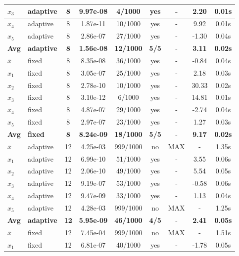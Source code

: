 \begin{longtable}{|l|l|c|c|c|c|c|c|c|}
\hline
$x_3$ & adaptive & 8 & 9.97e-08 & 4/1000 & yes & - & 2.20 & 0.01s \\
\hline
$x_4$ & adaptive & 8 & 1.87e-11 & 10/1000 & yes & - & 9.92 & 0.01s \\
\hline
$x_5$ & adaptive & 8 & 2.86e-07 & 27/1000 & yes & - & -1.30 & 0.04s \\
\hline
\hline\hline
\textbf{Avg} & \textbf{adaptive} & \textbf{8} & \textbf{1.56e-08} & \textbf{12/1000} & \textbf{5/5} & - & \textbf{3.11} & \textbf{0.02s} \\
\hline\hline
\hline
$\bar{x}$ & fixed & 8 & 8.35e-08 & 36/1000 & yes & - & -0.84 & 0.04s \\
\hline
$x_1$ & fixed & 8 & 3.05e-07 & 25/1000 & yes & - & 2.18 & 0.03s \\
\hline
$x_2$ & fixed & 8 & 2.78e-10 & 10/1000 & yes & - & 30.33 & 0.02s \\
\hline
$x_3$ & fixed & 8 & 3.10e-12 & 6/1000 & yes & - & 14.81 & 0.01s \\
\hline
$x_4$ & fixed & 8 & 4.87e-07 & 29/1000 & yes & - & -2.74 & 0.04s \\
\hline
$x_5$ & fixed & 8 & 2.97e-07 & 23/1000 & yes & - & 1.27 & 0.03s \\
\hline
\hline\hline
\textbf{Avg} & \textbf{fixed} & \textbf{8} & \textbf{8.24e-09} & \textbf{18/1000} & \textbf{5/5} & - & \textbf{9.17} & \textbf{0.02s} \\
\hline\hline
$\bar{x}$ & adaptive & 12 & 4.25e-03 & 999/1000 & no & MAX & - & 1.35s \\
\hline
$x_1$ & adaptive & 12 & 6.99e-10 & 51/1000 & yes & - & 3.55 & 0.06s \\
\hline
$x_2$ & adaptive & 12 & 2.06e-10 & 49/1000 & yes & - & 5.54 & 0.05s \\
\hline
$x_3$ & adaptive & 12 & 9.19e-07 & 53/1000 & yes & - & -0.58 & 0.06s \\
\hline
$x_4$ & adaptive & 12 & 9.47e-09 & 33/1000 & yes & - & 1.13 & 0.04s \\
\hline
$x_5$ & adaptive & 12 & 4.28e-03 & 999/1000 & no & MAX & - & 1.25s \\
\hline
\hline\hline
\textbf{Avg} & \textbf{adaptive} & \textbf{12} & \textbf{5.95e-09} & \textbf{46/1000} & \textbf{4/5} & - & \textbf{2.41} & \textbf{0.05s} \\
\hline\hline
\hline
$\bar{x}$ & fixed & 12 & 7.45e-04 & 999/1000 & no & MAX & - & 1.51s \\
\hline
$x_1$ & fixed & 12 & 6.81e-07 & 40/1000 & yes & - & -1.78 & 0.05s \\

\end{longtable}
